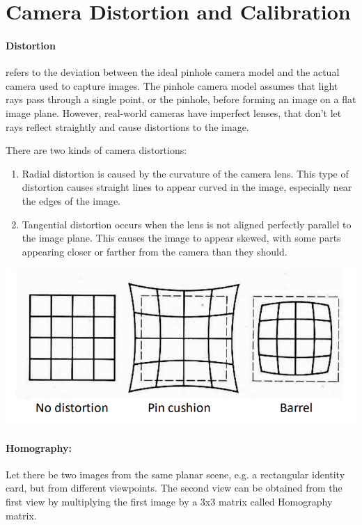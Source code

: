 \documentclass[11pt]{article}
\begin{document}
    \section{Camera Distortion and Calibration}

    \paragraph{Distortion} refers to the deviation between the ideal pinhole camera model and the actual camera
    used to capture images. The pinhole camera model assumes that light rays pass through a single point, or
    the pinhole, before forming an image on a flat image plane. However, real-world cameras have imperfect
    lenses, that don't let rays reflect straightly and cause distortions to the image.

    There are two kinds of camera distortions:

    \begin{enumerate}
        \item Radial distortion is caused by the curvature of the camera lens. This type of distortion
        causes straight lines to appear curved in the image, especially near the edges of the image.
        \item Tangential distortion occurs when the lens is not aligned perfectly parallel to the image plane.
        This causes the image to appear skewed, with some parts appearing closer or farther from the camera
        than they should.
    \end{enumerate}
    {\includegraphics[width=\textwidth,height=\textheight,keepaspectratio]{distortion.PNG}}

    \paragraph{Homography:} Let there be two images from the same planar scene, e.g. a rectangular identity card, but from
    different viewpoints. The second view can be obtained from the first view by multiplying the first image by
    a 3x3 matrix called Homography matrix.
\end{document}
